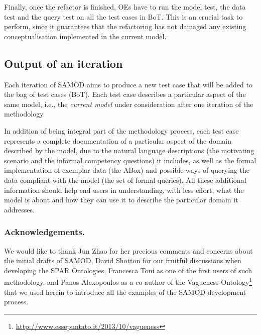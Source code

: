 \documentclass[runningheads,a4paper]{llncs}
\begin{document}
Finally, once the refactor is finished, OEs have to run the model test, the data test and the query test on all the test cases in BoT. This is an crucial task to perform, since it guarantees that the refactoring has not damaged any existing conceptualisation implemented in the current model.

\subsection{Output of an iteration}

Each iteration of SAMOD aims to produce a new test case that will be added to the bag of test cases (BoT). Each test case describes a particular aspect of the same model, i.e., the {\em current model} under consideration after one iteration of the methodology. 

In addition of being integral part of the methodology process, each test case represents a complete documentation of a particular aspect of the domain described by the model, due to the natural language descriptions (the motivating scenario and the informal competency questions) it includes, as well as the formal implementation of exemplar data (the ABox) and possible ways of querying the data compliant with the model (the set of formal queries). All these additional information should help end users in understanding, with less effort, what the model is about and how they can use it to describe the particular domain it addresses.

\subsubsection*{Acknowledgements.}We would like to thank Jun Zhao for her precious comments and concerns about the initial drafts of SAMOD, David Shotton for our fruitful discussions when developing the SPAR Ontologies, Francesca Toni as one of the first users of such methodology, and Panos Alexopoulos as a co-author of the Vagueness Ontology\footnote{\url{http://www.essepuntato.it/2013/10/vagueness}} that we used herein to introduce all the examples of the SAMOD development process.
\end{document}
